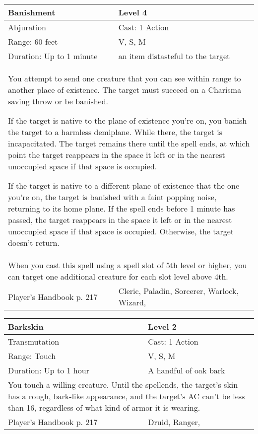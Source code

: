\documentclass[11pt]{report}
\begin{document}
\begin{table}[H]
	\begin{tabular}{||p{6cm}|p{6cm}||}
		\hline\hline
		\bf{Banishment} & Level 4\\ \hline
		Abjuration & Cast: 1 Action\\ \hline
		Range: 60 feet & V, S, M\\ \hline
		Duration: Up to 1 minute & an item distasteful to the target\\ \hline
		\multicolumn{2}{||p{12cm}||}{You attempt to send one creature that you can see within range to another place of existence. The target must succeed on a Charisma saving throw or be banished. 

If the target is native to the plane of existence you’re on, you banish the target to a harmless demiplane. While there, the target is incapacitated. The target remains there until the spell ends, at which point the target reappears in the space it left or in the nearest unoccupied space if that space is occupied. 

If the target is native to a different plane of existence that the one you’re on, the target is banished with a faint popping noise, returning to its home plane. 
If the spell ends before 1 minute has passed, the target reappears in the space it left or in the nearest unoccupied space if that space is occupied. Otherwise, the target doesn’t return.}\\ \hline
		\multicolumn{2}{||p{12cm}||}{When you cast this spell using a spell slot of 5th level or higher, you can target one additional creature for each slot level above 4th.}\\ \hline
Player's Handbook p. 217 & Cleric, Paladin, Sorcerer, Warlock, Wizard, \\ \hline\hline
	\end{tabular}
\end{table}

\begin{table}[H]
	\begin{tabular}{||p{6cm}|p{6cm}||}
		\hline\hline
		\bf{Barkskin} & Level 2\\ \hline
		Transmutation & Cast: 1 Action\\ \hline
		Range: Touch & V, S, M\\ \hline
		Duration: Up to 1 hour & A handful of oak bark\\ \hline
		\multicolumn{2}{||p{12cm}||}{You touch a willing creature. Until the spellends, the target’s skin has a rough, bark-like appearance, and the target’s AC can’t be less than 16, regardless of what kind of armor it is wearing.}\\ \hline
Player's Handbook p. 217 & Druid, Ranger, \\ \hline\hline
	\end{tabular}
\end{table}
\end{document}
